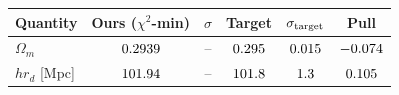 \begin{tabular}{lccccc}
\toprule
Quantity & Ours ($\chi^2$-min) & $\sigma$ & Target & $\sigma_{\rm target}$ & Pull \\
\midrule
$\Omega_m$ & $0.2939$ & -- & $0.295$ & $0.015$ & $-0.074$ \\
$h r_d$ [Mpc] & $101.94$ & -- & $101.8$ & $1.3$ & $0.105$ \\
\bottomrule
\end{tabular}
